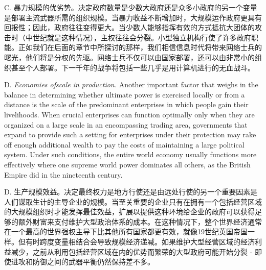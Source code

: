 \begin{Parallel}{97mm}{72mm}
  \ParallelRText
  {C. 暴力规模的优劣势。决定政府数量是少数大政府还是众多小政府的另一个变量是部署主流武器所需的组织规模。当暴力收益不断增加时，大规模运作政府更具有回报性；因此，政府往往变得更大。当少数人能够指挥有效的方式抵抗大团体的攻击时（中世纪就是这种情况），主权往往会分裂。小型独立机构行使了许多政府职能。正如我们在后面的章节中所探讨的那样，我们相信信息时代将带来网络士兵的曙光，他们将是分权的先驱。网络士兵不仅可以由国家部署，还可以由非常小的组织甚至个人部署。下一千年的战争将包括一些几乎是用计算机进行的无血战斗。}
  \ParallelPar



  \ParallelLText
  {D. \emph{Economies ofscale in production.} Another important factor that weighs in the balance in determining whether ultimate power is exercised locally or from a distance is the scale of the predominant enterprises in which people gain their livelihoods. When crucial enterprises can function optimally only when they are organized on a large scale in an encompassing trading area, governments that expand to provide such a setting for enterprises under their protection may rake off enough additional wealth to pay the costs of maintaining a large political system. Under such conditions, the entire world economy usually functions more effectively where one supreme world power dominates all others, as the British Empire did in the nineteenth century. }
  
  \ParallelRText
  {D. 生产规模效益。决定最终权力是地方行使还是由远处行使的另一个重要因素是人们谋取生计的主导企业的规模。当至关重要的企业只有在拥有一个包括经营区域的大规模组织时才能发挥最佳效益，扩展以提供这种环境给企业的政府可以获得足够的额外财富来支付维护大型政治体系的成本。在这种情况下，整个世界经济通常在一个最高的世界强权主导下比其他所有国家都更有效，就像19世纪英国帝国一样。但有时跨度变量相结合会导致规模经济递减。如果维护大型经营区域的经济利益减少，之前从利用包括经营区域在内的优势而繁荣的大型政府可能开始分裂 - 即使进攻和防御之间的武器平衡仍然保持差不多。}
  \ParallelPar


  \ParallelPar


\end{Parallel}
